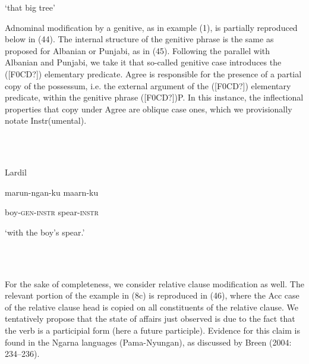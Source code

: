 \documentclass[output=paper]{langsci/langscibook}
\begin{document}
\begin{styleSfondomedioiColorexi}
‘that big tree’
\end{styleSfondomedioiColorexi}

\begin{styleSfondomedioiColorexxi}
Adnominal modification by a genitive, as in example (1), is partially reproduced below in (44). The internal structure of the genitive phrase is the same as proposed for Albanian or Punjabi, as in (45). Following the parallel with Albanian and Punjabi, we take it that so-called genitive case introduces the ([F0CD?]) elementary predicate. Agree is responsible for the presence of a partial copy of the possessum, i.e. the external argument of the ([F0CD?]) elementary predicate, within the genitive phrase ([F0CD?])P. In this instance, the inflectional properties that copy under Agree are oblique case ones, which we provisionally notate Instr(umental).  
\end{styleSfondomedioiColorexxi}

\begin{styleSfondomedioiColorexxi}
\ea%
    \label{ex:key:44}
    \gll\\
        \\
    \glt
    \z

           Lardil
\end{styleSfondomedioiColorexxi}

\begin{styleSfondomedioiColorexxi}
marun-ngan-ku   maarn-ku     
\end{styleSfondomedioiColorexxi}

\begin{styleSfondomedioiColorexxi}
boy-\textsc{gen-instr}  spear-\textsc{instr} 
\end{styleSfondomedioiColorexxi}

\begin{styleSfondomedioiColorexi}
‘with the boy’s spear.’                
\end{styleSfondomedioiColorexi}

\begin{styleSfondomedioiColorexxi}
\ea%
    \label{ex:key:45}
    \gll\\
        \\
    \glt
    \z

           
\end{styleSfondomedioiColorexxi}

 
\begin{styleSfondomedioiColorexi}
For the sake of completeness, we consider relative clause modification as well. The relevant portion of the example in (8c) is reproduced in (46), where the Acc case of the relative clause head is copied on all constituents of the relative clause. We tentatively propose that the state of affairs just observed is due to the fact that the verb is a participial form (here a future participle). Evidence for this claim is found in the Ngarna languages (Pama-Nyungan), as discussed by Breen (2004: 234–236).  
\end{styleSfondomedioiColorexi}
\end{document}
